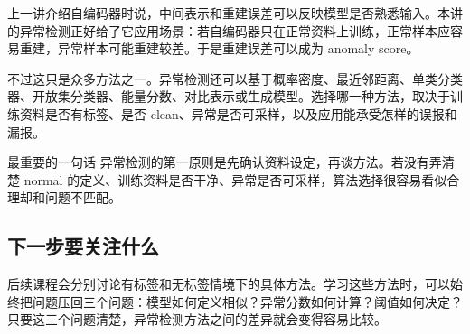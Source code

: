 \documentclass[a4paper]{article}
\begin{document}
上一讲介绍自编码器时说，中间表示和重建误差可以反映模型是否熟悉输入。本讲的异常检测正好给了它应用场景：若自编码器只在正常资料上训练，正常样本应容易重建，异常样本可能重建较差。于是重建误差可以成为 anomaly score。

不过这只是众多方法之一。异常检测还可以基于概率密度、最近邻距离、单类分类器、开放集分类器、能量分数、对比表示或生成模型。选择哪一种方法，取决于训练资料是否有标签、是否 clean、异常是否可采样，以及应用能承受怎样的误报和漏报。

\begin{importantbox}{最重要的一句话}
    异常检测的第一原则是先确认资料设定，再谈方法。若没有弄清楚 normal 的定义、训练资料是否干净、异常是否可采样，算法选择很容易看似合理却和问题不匹配。
\end{importantbox}

\subsection{下一步要关注什么}

后续课程会分别讨论有标签和无标签情境下的具体方法。学习这些方法时，可以始终把问题压回三个问题：模型如何定义相似？异常分数如何计算？阈值如何决定？只要这三个问题清楚，异常检测方法之间的差异就会变得容易比较。
\end{document}
